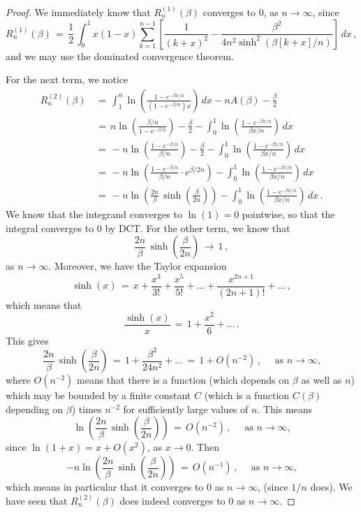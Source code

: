 \documentclass[12pt]{report}
\theoremstyle{definition}
\begin{document}
\begin{proof}
We immediately know that $R_n^{(1)}(\beta)$
converges to $0$, as $n \to \infty$, since
$$
R_n^{(1)}(\beta)\, =\, \frac{1}{2}\,\int_0^1 x(1-x)  \sum_{k=1}^{n-1} \left[\frac{1}{(k+x)^2} - \frac{\beta^2}{4 n^2 \sinh^2(\beta[k+x]/n)}\right]\, dx\, ,
$$
and we may use the dominated convergence theorem.

For the next term, we notice
\begin{align*}
R_n^{(2)}(\beta)\, 
&=\, \int_1^n \ln\left(\frac{1-e^{-\beta x/n}}{(1-e^{-\beta/n})x}\right)\, dx - n A(\beta) - \frac{\beta}{2}\\
&=\, n \ln\left(\frac{\beta/n}{1-e^{-\beta/n}}\right) - \frac{\beta}{2} - \int_0^1 \ln\left(\frac{1-e^{-\beta x/n}}{\beta x/n}\right)\, dx\\
&=\, - n \ln \left(\frac{1-e^{-\beta/n}}{\beta/n}\right) - \frac{\beta}{2} - \int_0^1 \ln\left(\frac{1-e^{-\beta x/n}}{\beta x/n}\right)\, dx\\
&=\, - n \ln \left( \frac{1-e^{-\beta/n}}{\beta/n} \cdot e^{\beta/2n}\right) - \int_0^1 \ln\left(\frac{1-e^{-\beta x/n}}{\beta x/n}\right)\, dx\\
&=\, -n \ln \left( \frac{2n}{\beta}\, \sinh\left( \frac{\beta}{2n} \right) \right) -  \int_0^1 \ln\left(\frac{1-e^{-\beta x/n}}{\beta x/n}\right)\, dx\, .
\end{align*}
We know that the integrand converges to $\ln(1) = 0$ pointwise, so that the integral converges to 0
by DCT.
For the other term, we know that
$$
\frac{2n}{\beta}\, \sinh\left( \frac{\beta}{2n} \right)\, \to\, 1\, ,
$$
as $n \to \infty$.
Moreover, we have the Taylor expansion
$$
\sinh(x)\, =\, x + \frac{x^3}{3!} + \frac{x^5}{5!} + \dots + \frac{x^{2n+1}}{(2n+1)!} + \dots\, ,
$$
which means that
$$
\frac{\sinh(x)}{x}\, =\, 1 + \frac{x^2}{6} + \dots\, .
$$
This gives
$$
\frac{2n}{\beta}\, \sinh\left( \frac{\beta}{2n} \right)\, =\, 1 + \frac{\beta^2}{24n^2} + \dots\, =\,
1 + O(n^{-2})\, , \quad \text { as $n \to \infty$,}
$$
where $O(n^{-2})$ means that there is a function (which depends on $\beta$ as well as $n$)
which may be bounded by a finite constant $C$ (which is a function $C(\beta)$ depending on $\beta$)
times $n^{-2}$ for sufficiently large values of $n$.
This means
$$
\ln\left( \frac{2n}{\beta}\, \sinh\left( \frac{\beta}{2n} \right) \right)\,
=\, O(n^{-2})\, , \quad \text { as $n \to \infty$,}
$$
since $\ln(1+x) = x + O(x^2)$, as $x \to 0$.
Then
$$
-n \ln \left( \frac{2n}{\beta}\, \sinh\left( \frac{\beta}{2n} \right) \right)\, =\, O(n^{-1})\, , \quad \text { as $n \to \infty$,}
$$
which means in particular that it converges to $0$ as $n \to \infty$, (since $1/n$ does).
We have seen that $R_n^{(2)}(\beta)$ does indeed converges to $0$ as $n \to \infty$.


\end{proof}
\end{document}
